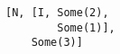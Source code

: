 \begin{lstlisting}[style=scalaioScala]
[N, [I, Some(2),
        Some(1)],
    Some(3)]
\end{lstlisting}
